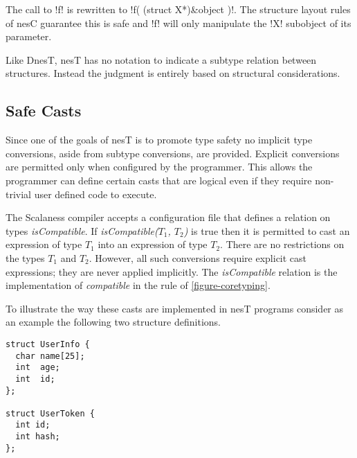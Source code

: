 
The call to !f! is rewritten to !f( (struct X*)&object )!. The structure layout rules of nesC
guarantee this is safe and !f! will only manipulate the !X! subobject of its parameter.


Like DnesT, nesT has no notation to indicate a subtype relation between structures. Instead the
judgment is entirely based on structural considerations.

\subsection{Safe Casts}
\label{section-safe-casts}

Since one of the goals of nesT is to promote type safety no implicit type conversions, aside
from subtype conversions, are provided. Explicit conversions are permitted only when configured
by the programmer. This allows the programmer can define certain casts that are logical even if
they require non-trivial user defined code to execute.

The Scalaness compiler accepts a configuration file that defines a relation on types
\textit{isCompatible}. If \textit{isCompatible($T_1$, $T_2$)} is true then it is permitted to
cast an expression of type $T_1$ into an expression of type $T_2$. There are no restrictions on
the types $T_1$ and $T_2$. However, all such conversions require explicit cast expressions; they
are never applied implicitly. The \textit{isCompatible} relation is the implementation of
\textit{compatible} in the  rule of \autoref{figure-coretyping}.

To illustrate the way these casts are implemented in nesT programs consider as an example the
following two structure definitions.

\singlespace
\vspace{1.0ex}
\begin{lstlisting}[language=nesC]
struct UserInfo {
  char name[25];
  int  age;
  int  id;
};

struct UserToken {
  int id;
  int hash;
};
\end{lstlisting}
\vspace{1.0ex}
\primaryspacing

